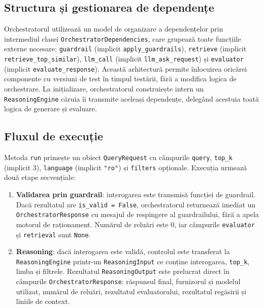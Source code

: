 \documentclass[12pt, a4paper, oneside, romanian]{teza-upb}
\begin{document}
\subsection{Structura și gestionarea de dependențe}

Orchestratorul utilizează un model de organizare a dependențelor prin intermediul 
clasei \texttt{OrchestratorDependencies}, care grupează toate funcțiile externe necesare: \texttt{guardrail} (implicit \texttt{apply\_guardrails}), \texttt{retrieve} (implicit \texttt{retrieve\_top\_similar}), \texttt{llm\_call} (implicit \texttt{llm\_ask\_request}) și \texttt{evaluator} (implicit \texttt{evaluate\_response}). Această arhitectură permite înlocuirea oricărei componente cu versiuni de test în timpul testării, fără a modifica logica de orchestrare. La inițializare, orchestratorul construiește intern un \texttt{ReasoningEngine} căruia îi transmite aceleași dependențe, delegând acestuia toată logica de generare și evaluare.

\subsection{Fluxul de execuție}

Metoda \texttt{run} primește un obiect \texttt{QueryRequest} cu câmpurile \texttt{query}, \texttt{top\_k} (implicit 3), \texttt{language} (implicit \texttt{"ro"}) și \texttt{filters} opționale. Execuția urmează două etape secvențiale:

\begin{enumerate}
    \item \textbf{Validarea prin guardrail}: interogarea este transmisă funcției de guardrail. Dacă rezultatul are \texttt{is\_valid = False}, orchestratorul returnează imediat un \texttt{OrchestratorResponse} cu mesajul de respingere al guardrailului, fără a apela motorul de raționament. Numărul de reluări este 0, iar câmpurile \texttt{evaluator} și \texttt{retrieval} sunt \texttt{None}.
    \item \textbf{Reasoning}: dacă interogarea este validă, controlul este transferat la  \texttt{ReasoningEngine} printr-un \texttt{ReasoningInput} ce conține interogarea, \texttt{top\_k}, limba și filtrele. Rezultatul \texttt{ReasoningOutput} este prelucrat direct în câmpurile \texttt{OrchestratorResponse}: răspunsul final, furnizorul și modelul utilizat, numărul de reluări, rezultatul evaluatorului, rezultatul regăsirii și liniile de context.
\end{enumerate}
\end{document}
